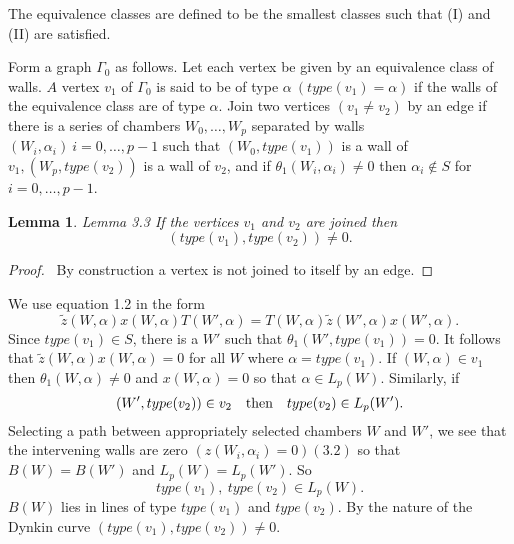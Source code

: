 \documentclass{memo-l}
\newtheorem{lemma}[theorem]{Lemma}
\theoremstyle{definition}
\theoremstyle{remark}
\numberwithin{section}{chapter}
\numberwithin{equation}{chapter}
\begin{document}
\noindent
The equivalence classes are defined to be the smallest classes such that
(I) and (II) are satisfied.
 
   Form a graph ${\Gamma}_{0}$ as follows.  Let each vertex be given by an
equivalence class of walls.  $A$ vertex $v_{1}$ of ${\Gamma}_{0}$ is said
to be of type ${\alpha} \ (type(v_{1})={\alpha})$ if the walls of the
equivalence class are of type ${\alpha}$.  Join two vertices $(v_{1}\ne
v_{2})$ by an edge if there is a series of chambers $W_{0},\ldots ,W_{p}$
separated by walls $(W_{i},{\alpha}_{i}) \ i = 0,\ldots ,p-1$ such that
$(W_{0},type(v_{1}))$ is a wall of $v_{1}, (W_{p},type(v_{2}))$ is a wall
of $v_{2}$, and if ${\theta}_{1}(W_{i},{\alpha}_{i})\ne 0$ then
${\alpha}_{i} {\notin} S$ for $i = 0,\ldots ,p-1$.

\medskip

\begin{lemma}{Lemma 3.3} If the vertices $v_{1}$ and $v_{2}$ are joined
then $$(type(v_{1}),type(v_{2}))\ne 0.$$ 
\end{lemma}

\medpagebreak

\begin{proof} \ By construction a vertex is not joined to itself by an
edge.
\end{proof}  

\medpagebreak

   We use equation 1.2 in the form
$$
\tilde {z} (W,{\alpha})x(W,{\alpha})T(W',{\alpha}) = T(W,{\alpha})\tilde z
(W',{\alpha})x(W',{\alpha}).
$$
Since $type(v_{1})  \in  S$, there is a $W'$ such that
${\theta}_{1}(W',type(v_{1}))=0$.  It follows that $\tilde z(W,{\alpha})x(W,{\alpha})=0$ 
for all $W$ where ${\alpha} = type(v_{1})$.  If
$(W,{\alpha})  \in  v_{1}$ then ${\theta}_{1}(W,{\alpha})\ne 0$ and
$x(W,{\alpha}) = 0$ so that ${\alpha}  \in  L_{p}(W)$.  Similarly, if
$$(W',type(v_{2}))  \in  v_{2} \quad \hbox{then}\quad  type(v_{2})  \in  L_{p}(W').$$
Selecting a path between appropriately selected chambers $W$ and $W'$, we
see that the intervening walls are zero $(z(W_{i},{\alpha}_{i}) = 0) (3.2)$
so that $B(W) = B(W')$ and $L_{p}(W) = L_{p}(W')$.  So $$type(v_{1}),\
type(v_{2})  \in  L_{p}(W).$$  $B(W)$ lies in lines of type $type(v_{1})$
and $type(v_{2})$.  By the nature of the Dynkin curve
$(type(v_{1}),type(v_{2})) \ne 0$.

{\medskip}
\end{document}
